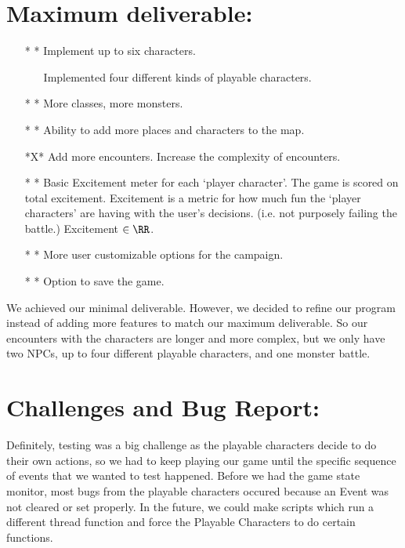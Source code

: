 \documentclass{article}
\theoremstyle{definition}
\begin{document}
\section*{Maximum deliverable:}
\begin{enumerate}
\item [* *] Implement up to six characters.
\begin{enumerate}
\item [\rightarrow] Implemented four different kinds of playable characters.
\end{enumerate}
\item [* *] More classes, more monsters.
\item [* *] Ability to add more places and characters to the map.
\item [*X*] Add more encounters. Increase the complexity of encounters.
\item [* *] Basic Excitement meter for each `player character'. The game is scored
		  on total excitement. Excitement is
		  a metric for how much fun the `player characters' are having with the
		  user's decisions. (i.e. not purposely failing the battle.) Excitement $\in \RR$.
\item [* *] More user customizable options for the campaign.
\item [* *] Option to save the game.
\end{enumerate}

We achieved our minimal deliverable. However, we decided to refine our program
instead of adding more features to match our maximum deliverable. So our encounters
with the characters are longer and more complex, but we only have two NPCs, 
up to four different playable characters, and one monster battle.


\section*{\huge{Challenges and Bug Report:}}

Definitely, testing was a big challenge as the playable characters decide to
do their own actions, so we had to keep playing our game until the specific
sequence of events that we wanted to test happened. Before we had the game
state monitor, most bugs from the playable characters occured because an Event 
was not cleared or set properly. In the future, we could make scripts which
run a different thread function and force the Playable Characters to do 
certain functions. \\
\end{document}
